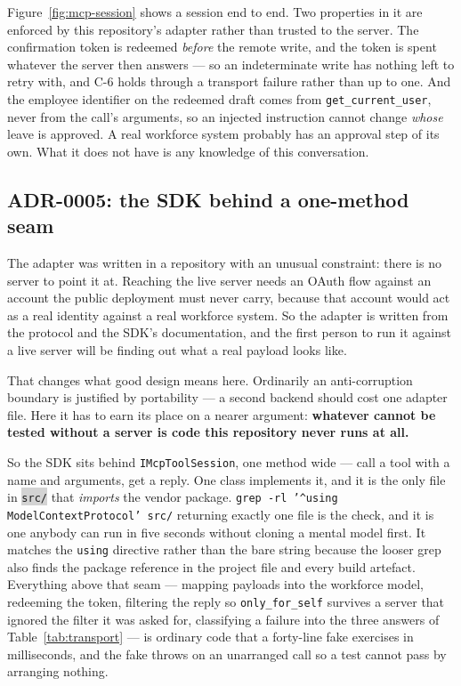 \documentclass[11pt,a4paper]{article}
\newcommand{\repopath}[1]{\colorbox{lightgray}{\texttt{#1}}}
\newcommand{\finding}[1]{{\color{primaryblue}\textbf{#1}}}
\begin{document}
Figure~\ref{fig:mcp-session} shows a session end to end. Two properties in it are enforced by this repository's adapter rather than trusted to the server. The confirmation token is redeemed \emph{before} the remote write, and the token is spent whatever the server then answers --- so an indeterminate write has nothing left to retry with, and C-6 holds through a transport failure rather than up to one. And the employee identifier on the redeemed draft comes from \texttt{get\_current\_user}, never from the call's arguments, so an injected instruction cannot change \emph{whose} leave is approved. A real workforce system probably has an approval step of its own. What it does not have is any knowledge of this conversation.

\subsection{ADR-0005: the SDK behind a one-method seam}

The adapter was written in a repository with an unusual constraint: there is no server to point it at. Reaching the live server needs an OAuth flow against an account the public deployment must never carry, because that account would act as a real identity against a real workforce system. So the adapter is written from the protocol and the SDK's documentation, and the first person to run it against a live server will be finding out what a real payload looks like.

That changes what good design means here. Ordinarily an anti-corruption boundary is justified by portability --- a second backend should cost one adapter file. Here it has to earn its place on a nearer argument: \finding{whatever cannot be tested without a server is code this repository never runs at all.}

So the SDK sits behind \texttt{IMcpToolSession}, one method wide --- call a tool with a name and arguments, get a reply. One class implements it, and it is the only file in \repopath{src/} that \emph{imports} the vendor package. \texttt{grep -rl '\textasciicircum{}using ModelContextProtocol' src/} returning exactly one file is the check, and it is one anybody can run in five seconds without cloning a mental model first. It matches the \texttt{using} directive rather than the bare string because the looser grep also finds the package reference in the project file and every build artefact. Everything above that seam --- mapping payloads into the workforce model, redeeming the token, filtering the reply so \texttt{only\_for\_self} survives a server that ignored the filter it was asked for, classifying a failure into the three answers of Table~\ref{tab:transport} --- is ordinary code that a forty-line fake exercises in milliseconds, and the fake throws on an unarranged call so a test cannot pass by arranging nothing.
\end{document}
